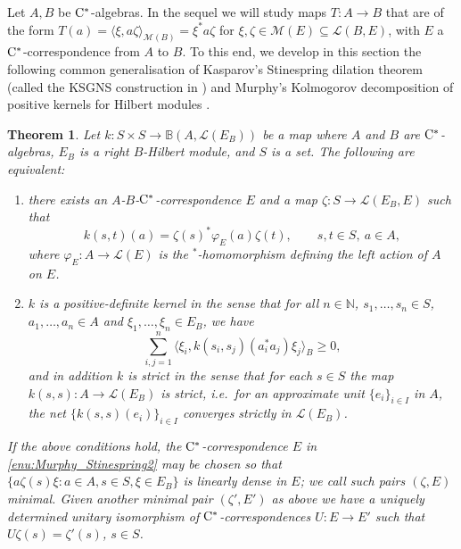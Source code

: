 \documentclass[11 pt, leqno]{amsart}
\numberwithin{equation}{section}
\theoremstyle{plain}
\newtheorem{thm}{Theorem}[section]
\theoremstyle{definition}
\newcommand{\BB}{\mathbb B}
\newcommand{\M}{\mathcal M}
\renewcommand{\L}{\mathcal L}
\newcommand{\N}{\mathbb N}
\newcommand{\cst}{\ifmmode\mathrm{C}^*\else{$\mathrm{C}^*$}\fi}
\begin{document}
Let $A, B$ be $\cst$-algebras. 
In the sequel we will study maps $T:A\to B$ that are of the form $T(a)=\langle \xi, a \zeta \rangle_{\M(B)}= \xi^* a \zeta$ for $\xi, \zeta \in \M(E)\subseteq \L(B,E)$, with $E$ a $\cst$-correspondence from $A$ to $B$. 
To this end, we develop in this section the following common generalisation of Kasparov's Stinespring dilation theorem (called the KSGNS construction in \cite[Theorem 5.6]{Lance}) and  Murphy's Kolmogorov decomposition of positive kernels for Hilbert modules \cite[Theorem 2.3]{Mur}.

\begin{thm}\label{thm:Murphy_Stinespring}
Let $k:S \times S \to \BB(A,\L(E_B))$ be a map where $A$ and $B$ are $\cst$-algebras, $E_B$ is a right $B$-Hilbert module, and $S$ is a set. 
The following are equivalent:
\begin{enumerate}
    \item\label{enu:Murphy_Stinespring2} there exists an $A$-$B$-$\cst$-correspondence $E$  and a map $\zeta:S \to \L(E_B,E)$ such that 
    \[ 
        k(s,t)(a) =  \zeta(s)^* \varphi_E(a) \zeta(t),\qquad   s, t \in S,\  a \in A,
    \]
    where $\varphi_E:A\to \L(E)$ is the $^*$-homomorphism defining the left action of $A$ on $E$.
    \item\label{enu:Murphy_Stinespring1} $k$ is a \emph{positive-definite kernel} in the sense that for all $n \in \N$, $s_1,\ldots, s_n \in S$, $a_1, \ldots ,a_n\in A$ and $\xi_1, \ldots, \xi_n \in E_B$, we have
    \[
        \sum_{i,j=1}^n \langle \xi_i, k(s_i,s_j) (a_i^*a_j)\xi_j\rangle_B \geq 0,
    \]
    and in addition $k$ is \emph{strict} in the sense that for each $s\in S$ the map $k(s,s):A\to \L(E_B)$ is strict, i.e.\ for an approximate unit $\{e_i\}_{i \in I}$ in $A$, the net $\{k(s,s)(e_i)\}_{i \in I}$ converges strictly in $\L(E_B)$.
\end{enumerate}
If the above conditions hold, the $\cst$-correspondence $E$ in \ref{enu:Murphy_Stinespring2} may be chosen so that  $\{a\zeta(s)\xi: a\in A, s \in S, \xi \in E_B\}$ is linearly dense in $E$; we call such pairs $(\zeta,E)$ \emph{minimal}. 
Given another minimal pair $(\zeta',E')$ as above we have a uniquely determined unitary isomorphism of $\cst$-correspondences $U:E \to E'$ such that $U\zeta(s) = \zeta'(s)$, $s \in S$.
\end{thm}
\end{document}
